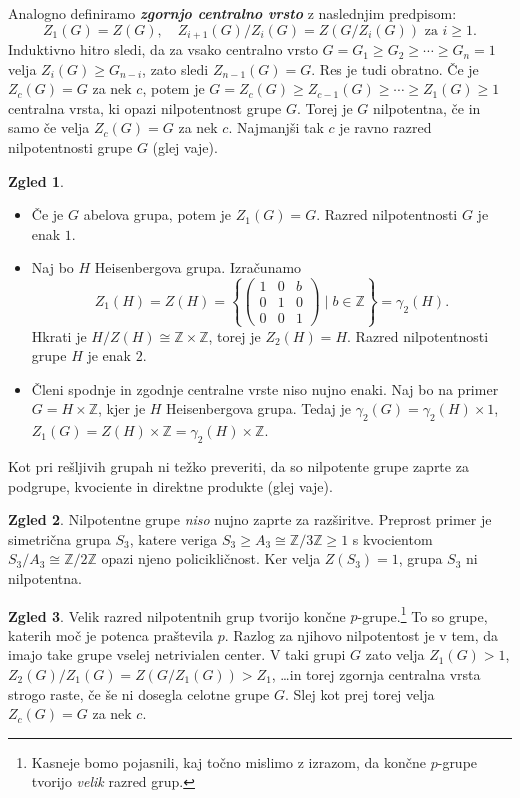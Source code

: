 \documentclass[11pt]{book}
\def\ZZ{\mathbb{Z}}
\def\definicija{\color{rdeca}\bf\em}
\def\literatura{\color{modra}}
\def\vaje{{\literatura (glej vaje)}}
\theoremstyle{definition}
\theoremstyle{zgled}
\newtheorem*{zgled}{Zgled}
\theoremstyle{odprtproblem}
\theoremstyle{domacanaloga}
\theoremstyle{izrek}
\begin{document}
Analogno definiramo {\definicija zgornjo centralno vrsto} z naslednjim predpisom:
\[
Z_1(G) = Z(G), \quad Z_{i+1}(G)/Z_i(G) = Z(G/Z_i(G)) \text{ za $i \geq 1$}.
\]
Induktivno hitro sledi, da za vsako centralno vrsto $G = G_1 \geq G_2 \geq \cdots \geq G_n = 1$ velja $Z_i(G) \geq G_{n-i}$, zato sledi $Z_{n-1}(G) = G$. Res je tudi obratno. Če je $Z_c(G) = G$ za nek $c$, potem je $G = Z_c(G) \geq Z_{c-1}(G) \geq \cdots \geq Z_1(G) \geq 1$ centralna vrsta, ki opazi nilpotentnost grupe $G$. Torej je $G$ nilpotentna, če in samo če velja $Z_c(G) = G$ za nek $c$. Najmanjši tak $c$ je ravno razred nilpotentnosti grupe $G$ \vaje.

\begin{zgled}
\begin{itemize}
    \item Če je $G$ abelova grupa, potem je $Z_1(G) = G$. Razred nilpotentnosti $G$ je enak $1$.

    \item Naj bo $H$ Heisenbergova grupa. Izračunamo
    \[
    Z_1(H) = Z(H) =
    \left\{ \begin{pmatrix}
    1 & 0 & b \\ 0 & 1 & 0 \\ 0 & 0 & 1
    \end{pmatrix} \mid b \in \ZZ \right\} = \gamma_2(H).
    \]
    Hkrati je $H/Z(H) \cong \ZZ \times \ZZ$, torej je $Z_2(H) = H$. Razred nilpotentnosti grupe $H$ je enak $2$.

    \item Členi spodnje in zgodnje centralne vrste niso nujno enaki. Naj bo na primer $G = H \times \ZZ$, kjer je $H$ Heisenbergova grupa. Tedaj je $\gamma_2(G) = \gamma_2(H) \times 1$, $Z_1(G) = Z(H) \times \ZZ = \gamma_2(H) \times \ZZ$.
\end{itemize}
\end{zgled}

Kot pri rešljivih grupah ni težko preveriti, da so nilpotente grupe zaprte za podgrupe, kvociente in direktne produkte \vaje.

\begin{zgled}
Nilpotentne grupe {\em niso} nujno zaprte za razširitve. Preprost primer je simetrična grupa $S_3$, katere veriga $S_3 \geq A_3 \cong \ZZ/3\ZZ \geq 1$ s kvocientom $S_3/A_3 \cong \ZZ/2\ZZ$ opazi njeno policikličnost. Ker velja $Z(S_3) = 1$, grupa $S_3$ ni nilpotentna.
\end{zgled}

\begin{zgled}
Velik razred nilpotentnih grup tvorijo končne $p$-grupe.\footnote{Kasneje bomo pojasnili, kaj točno mislimo z izrazom, da končne $p$-grupe tvorijo {\em velik} razred grup.} To so grupe, katerih moč je potenca praštevila $p$. Razlog za njihovo nilpotentost je v tem, da imajo take grupe vselej netrivialen center. V taki grupi $G$ zato velja $Z_1(G) > 1$, $Z_2(G)/Z_1(G) = Z(G/Z_1(G)) > Z_1$, \dots in torej zgornja centralna vrsta strogo raste, če še ni dosegla celotne grupe $G$. Slej kot prej torej velja $Z_c(G) = G$ za nek $c$.
\end{zgled}
\end{document}

